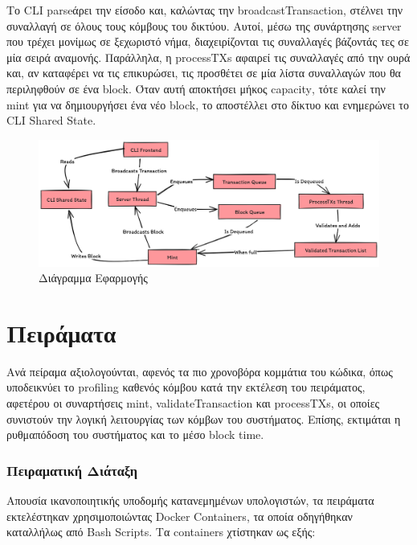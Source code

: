 \documentclass{article}
\newcommand{\eng}[1]{\foreignlanguage{english}{#1}} %
\begin{document}
Το \eng{CLI parse}άρει την είσοδο και, καλώντας την \eng{broadcastTransaction},
στέλνει την συναλλαγή σε όλους τους κόμβους του δικτύου. Αυτοί, μέσω της
συνάρτησης \eng{server} που τρέχει μονίμως σε ξεχωριστό νήμα, διαχειρίζονται
τις συναλλαγές βάζοντάς τες σε μία σειρά αναμονής. Παράλληλα, η \eng{processTXs}
αφαιρεί τις συναλλαγές από την ουρά και, αν καταφέρει να τις επικυρώσει, τις
προσθέτει σε μία λίστα συναλλαγών που θα περιληφθούν σε ένα \eng{block}. Όταν
αυτή αποκτήσει μήκος \eng{capacity}, τότε καλεί την \eng{mint} για να δημιουργήσει
ένα νέο \eng{block}, το αποστέλλει στο δίκτυο και ενημερώνει το \eng{CLI Shared State}.

\begin{figure}[ht]
    \includegraphics[width=\textwidth]{app-diagram.png}
    \caption{Διάγραμμα Εφαρμογής}
    \label{fig:app-diagram}
\end{figure}

\clearpage
\part{Πειράματα}

Ανά πείραμα αξιολογούνται, αφενός τα πιο χρονοβόρα κομμάτια του κώδικα, όπως
υποδεικνύει το \eng{profiling} καθενός κόμβου κατά την εκτέλεση του πειράματος,
αφετέρου οι συναρτήσεις \eng{mint}, \eng{validateTransaction} και
\eng{processTXs}, οι οποίες συνιστούν την λογική λειτουργίας των κόμβων του
συστήματος. Επίσης, εκτιμάται η ρυθμαπόδοση του συστήματος και το μέσο
\eng{block time}.

\section{Πειραματική Διάταξη}

Απουσία ικανοποιητικής υποδομής κατανεμημένων υπολογιστών, τα πειράματα εκτελέστηκαν
χρησιμοποιώντας \eng{Docker Containers}, τα οποία οδηγήθηκαν καταλλήλως από 
\eng{Bash Scripts}. Τα \eng{containers} χτίστηκαν ως εξής:
\end{document}
